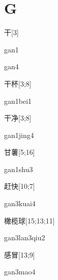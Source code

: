 \section*{G}

\begin{verbete}[gan1]{干}[3]
\begin{pronuncia}{gan1}
\end{pronuncia}
\begin{pronuncia}{gan4}
\end{pronuncia}
\end{verbete}

\begin{verbete}{干杯}[3;8]
\begin{pronuncia}{gan1bei1}
\end{pronuncia}
\end{verbete}

\begin{verbete}{干净}[3;8]
\begin{pronuncia}{gan1jing4}
\end{pronuncia}
\end{verbete}

\begin{verbete}{甘薯}[5;16]
\begin{pronuncia}{gan1shu3}
\end{pronuncia}
\end{verbete}

\begin{verbete}{赶快}[10;7]
\begin{pronuncia}{gan3kuai4}
\end{pronuncia}
\end{verbete}

\begin{verbete}{橄榄球}[15;13;11]
\begin{pronuncia}{gan3lan3qiu2}
\end{pronuncia}
\end{verbete}

\begin{verbete}{感冒}[13;9]
\begin{pronuncia}{gan3mao4}
\end{pronuncia}
\end{verbete}


